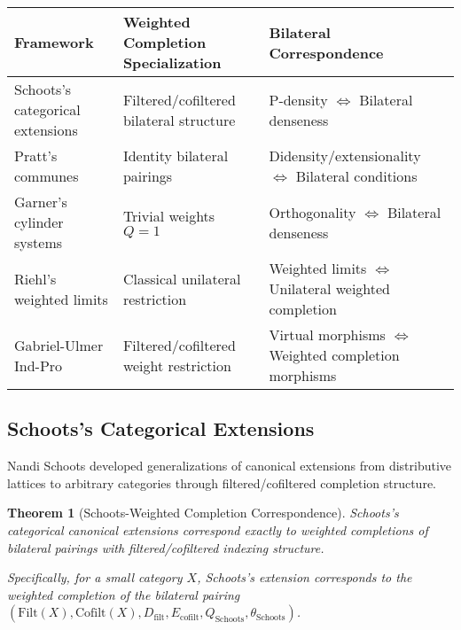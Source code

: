 \documentclass[11pt]{article}
\theoremstyle{plain}
\newtheorem{theorem}{Theorem}[section]
\theoremstyle{definition}
\theoremstyle{remark}
\begin{document}
\begin{center}
\renewcommand{\arraystretch}{1.4}
\begin{longtable}{@{}p{3.5cm}p{3.5cm}p{7cm}@{}}
\toprule
\textbf{Framework} & \textbf{Weighted Completion Specialization} & \textbf{Bilateral Correspondence} \\
\midrule
Schoots's categorical extensions & Filtered/cofiltered bilateral structure & P-density $\Leftrightarrow$ Bilateral denseness \\
\addlinespace
Pratt's communes & Identity bilateral pairings & Didensity/extensionality $\Leftrightarrow$ Bilateral conditions \\
\addlinespace
Garner's cylinder systems & Trivial weights $Q = 1$ & Orthogonality $\Leftrightarrow$ Bilateral denseness \\
\addlinespace
Riehl's weighted limits & Classical unilateral restriction & Weighted limits $\Leftrightarrow$ Unilateral weighted completion \\
\addlinespace
Gabriel-Ulmer Ind-Pro & Filtered/cofiltered weight restriction & Virtual morphisms $\Leftrightarrow$ Weighted completion morphisms \\
\bottomrule
\end{longtable}
\end{center}

\subsection{Schoots's Categorical Extensions}

Nandi Schoots \cite{schoots2015generalising} developed generalizations of canonical extensions from distributive lattices to arbitrary categories through filtered/cofiltered completion structure.

\begin{theorem}[Schoots-Weighted Completion Correspondence]\label{thm:schoots-correspondence}
Schoots's categorical canonical extensions correspond exactly to weighted completions of bilateral pairings with filtered/cofiltered indexing structure.

Specifically, for a small category $X$, Schoots's extension corresponds to the weighted completion of the bilateral pairing $(\text{Filt}(X), \text{Cofilt}(X), D_{\text{filt}}, E_{\text{cofilt}}, Q_{\text{Schoots}}, \theta_{\text{Schoots}})$.
\end{theorem}
\end{document}
